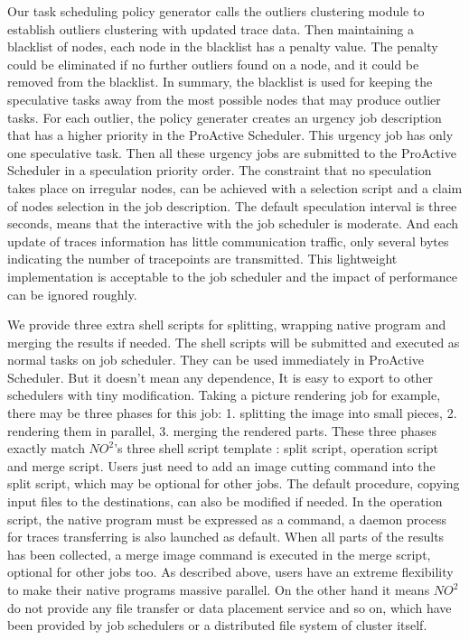 Our task scheduling policy generator calls the outliers clustering module to establish
outliers clustering with updated trace data. Then maintaining a blacklist of nodes, each
node in the blacklist has a penalty value. The penalty could be eliminated if no further
outliers found on a node, and it could be removed from the blacklist. In summary, the
blacklist is used for keeping the speculative tasks away from the most possible nodes that
may produce outlier tasks. For each outlier, the policy generater creates an urgency job
description that has a higher priority in the ProActive Scheduler. This urgency job has
only one speculative task. Then all these urgency jobs are submitted to the ProActive
Scheduler in a speculation priority order. The constraint that no speculation takes place
on irregular nodes, can be achieved with a selection script and a claim of nodes selection
in the job description. The default speculation interval is three seconds, means that the
interactive with the job scheduler is moderate. And each update of traces information has
little communication traffic, only several bytes indicating the number of tracepoints are
transmitted. This lightweight implementation is acceptable to the job scheduler and the
impact of performance can be ignored roughly.

We provide three extra shell scripts for splitting, wrapping native program and merging
the results if needed. The shell scripts will be submitted and executed as normal tasks on
job scheduler. They can be used immediately in ProActive Scheduler. But it doesn't mean
any dependence, It is easy to export to other schedulers with tiny modification. Taking a
picture rendering job for example, there may be three phases for this job: 1. splitting
the image into small pieces, 2. rendering them in parallel, 3. merging the rendered parts.
These three phases exactly match $NO^2$'s three shell script template : split script,
operation script and merge script. Users just need to add an image cutting command into
the split script, which may be optional for other jobs. The default procedure, copying
input files to the destinations, can also be modified if needed. In the operation script,
the native program must be expressed as a command, a daemon process for traces
transferring is also launched as default. When all parts of the results has been
collected, a merge image command is executed in the merge script, optional for other jobs
too. As described above,  users have an extreme flexibility to make their native programs
massive parallel. On the other hand it means $NO^2$ do not provide any file transfer or
data placement service and so on, which have been provided by job schedulers or a
distributed file system of cluster itself.
